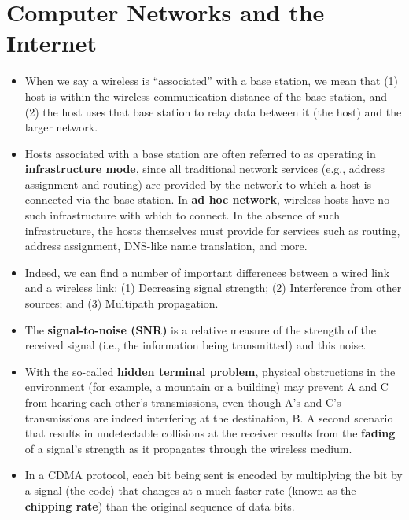 \section{Computer Networks and the Internet}
\begin{itemize}

\item
When we say a wireless is ``associated'' with a base station, we mean that (1) host is within the wireless communication distance of the base station, and (2) the host uses that base station to relay data between it (the host) and the larger network.

\item
Hosts associated with a base station are often referred to as operating in \textbf{infrastructure mode}, since all traditional network services (e.g., address assignment and routing) are provided by the network to which a host is connected via the base station. In \textbf{ad hoc network}, wireless hosts have no such infrastructure with which to connect. In the absence of such infrastructure, the hosts themselves must provide for services such as routing, address assignment, DNS-like name translation, and more.

\item
Indeed, we can find a number of important differences between a wired link and a wireless link: (1) Decreasing signal strength; (2) Interference from other sources; and (3) Multipath propagation.

\item
The \textbf{signal-to-noise (SNR)} is a relative measure of the strength of the received signal (i.e., the information being transmitted) and this noise.

\item
With the so-called \textbf{hidden terminal problem}, physical obstructions in the environment (for example, a mountain or a building) may prevent A and C from hearing each other's transmissions, even though A's and C's transmissions are indeed interfering at the destination, B. A second scenario that results in undetectable collisions at the receiver results from  the \textbf{fading} of a signal's strength as it propagates through the wireless medium.

\item
In a CDMA protocol, each bit being sent is encoded by multiplying the bit by a signal (the code) that changes at a much faster rate (known as the \textbf{chipping rate}) than the original sequence of data bits.


\end{itemize}
